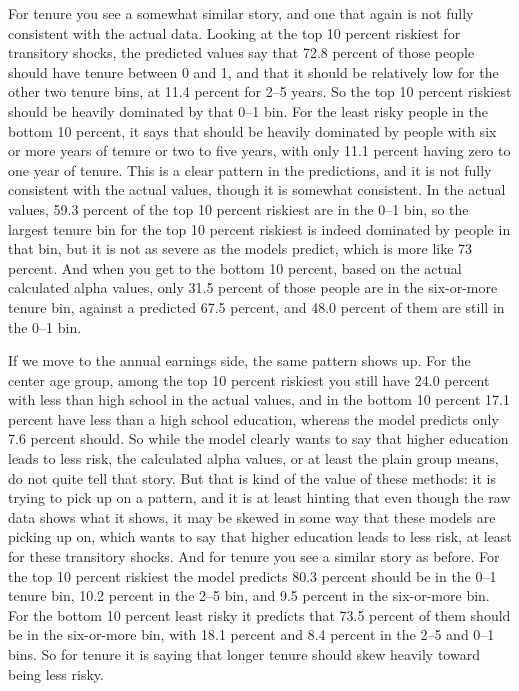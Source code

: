 \documentclass[12pt]{article}
\begin{document}
\begin{onehalfspace}
For tenure you see a somewhat similar story, and one that again is not fully consistent with the actual data. Looking at the top 10 percent riskiest for transitory shocks, the predicted values say that 72.8 percent of those people should have tenure between 0 and 1, and that it should be relatively low for the other two tenure bins, at 11.4 percent for 2--5 years. So the top 10 percent riskiest should be heavily dominated by that 0--1 bin. For the least risky people in the bottom 10 percent, it says that should be heavily dominated by people with six or more years of tenure or two to five years, with only 11.1 percent having zero to one year of tenure. This is a clear pattern in the predictions, and it is not fully consistent with the actual values, though it is somewhat consistent. In the actual values, 59.3 percent of the top 10 percent riskiest are in the 0--1 bin, so the largest tenure bin for the top 10 percent riskiest is indeed dominated by people in that bin, but it is not as severe as the models predict, which is more like 73 percent. And when you get to the bottom 10 percent, based on the actual calculated alpha values, only 31.5 percent of those people are in the six-or-more tenure bin, against a predicted 67.5 percent, and 48.0 percent of them are still in the 0--1 bin.

If we move to the annual earnings side, the same pattern shows up. For the center age group, among the top 10 percent riskiest you still have 24.0 percent with less than high school in the actual values, and in the bottom 10 percent 17.1 percent have less than a high school education, whereas the model predicts only 7.6 percent should. So while the model clearly wants to say that higher education leads to less risk, the calculated alpha values, or at least the plain group means, do not quite tell that story. But that is kind of the value of these methods: it is trying to pick up on a pattern, and it is at least hinting that even though the raw data shows what it shows, it may be skewed in some way that these models are picking up on, which wants to say that higher education leads to less risk, at least for these transitory shocks. And for tenure you see a similar story as before. For the top 10 percent riskiest the model predicts 80.3 percent should be in the 0--1 tenure bin, 10.2 percent in the 2--5 bin, and 9.5 percent in the six-or-more bin. For the bottom 10 percent least risky it predicts that 73.5 percent of them should be in the six-or-more bin, with 18.1 percent and 8.4 percent in the 2--5 and 0--1 bins. So for tenure it is saying that longer tenure should skew heavily toward being less risky.



\end{onehalfspace}
\end{document}
